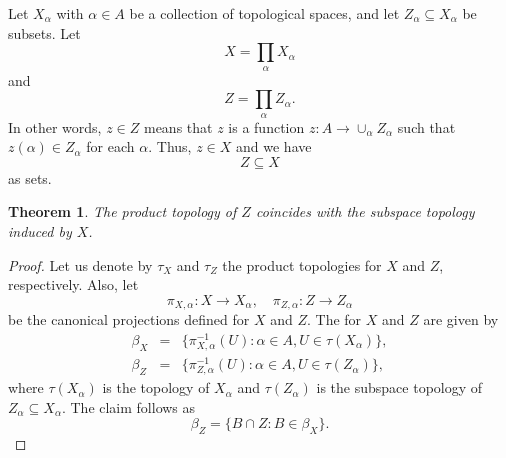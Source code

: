 \documentclass[12pt]{article}
\newtheorem{thm}{Theorem}
\begin{document}
Let $X_\alpha$ with $\alpha\in A$ be a collection of topological spaces,
and let $Z_\alpha\subseteq X_\alpha$ be subsets. Let
$$
  X=\prod_{\alpha} X_\alpha
$$
and
$$
  Z = \prod_{\alpha} Z_\alpha.
$$
In other words, $z\in Z$ means that $z$ is a function 
$z\colon A\to \cup_\alpha Z_\alpha$
such that $z(\alpha)\in Z_\alpha$ for each $\alpha$. Thus, $z\in X$ and 
we have
$$
   Z\subseteq X
$$
as sets. 

\begin{thm} The product topology of $Z$ coincides with the subspace topology induced by $X$. 
\end{thm}

\begin{proof}
Let us denote by $\tau_X$ and $\tau_Z$ the product topologies for $X$ and $Z$, respectively. 
Also, let 
$$
  \pi_{X,\alpha}\colon X\to X_\alpha, \quad   \pi_{Z,\alpha}\colon Z\to Z_\alpha
$$
be the canonical projections defined for $X$ and $Z$.
The  for $X$ and $Z$ are given by
\begin{eqnarray*}
\beta_X &=& \{ \pi_{X,\alpha}^{-1}(U) : \alpha \in A, U\in \tau(X_\alpha) \}, \\
\beta_Z &=& \{ \pi_{Z,\alpha}^{-1}(U) : \alpha \in A, U\in \tau(Z_\alpha) \}, 
\end{eqnarray*}
where $\tau(X_\alpha)$ is the topology of $X_\alpha$ and $\tau(Z_\alpha)$ is the
subspace topology of $Z_\alpha\subseteq X_\alpha$. 
The claim follows as
$$
  \beta_Z = \{ B\cap Z : B\in \beta_X \}.
$$
\end{proof}
\end{document}
